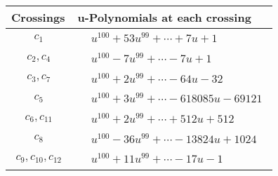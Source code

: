 \documentclass[1p]{elsarticle_modified}
\theoremstyle{definition}
\begin{document}
\begin{tabular}{m{50pt}|m{274pt}}
Crossings & \hspace{64pt}u-Polynomials at each crossing \\
\hline $$\begin{aligned}c_{1}\end{aligned}$$&$\begin{aligned}
&u^{100}+53 u^{99}+\cdots+7 u+1
\end{aligned}$\\
\hline $$\begin{aligned}c_{2},c_{4}\end{aligned}$$&$\begin{aligned}
&u^{100}-7 u^{99}+\cdots-7 u+1
\end{aligned}$\\
\hline $$\begin{aligned}c_{3},c_{7}\end{aligned}$$&$\begin{aligned}
&u^{100}+2 u^{99}+\cdots-64 u-32
\end{aligned}$\\
\hline $$\begin{aligned}c_{5}\end{aligned}$$&$\begin{aligned}
&u^{100}+3 u^{99}+\cdots-618085 u-69121
\end{aligned}$\\
\hline $$\begin{aligned}c_{6},c_{11}\end{aligned}$$&$\begin{aligned}
&u^{100}+2 u^{99}+\cdots+512 u+512
\end{aligned}$\\
\hline $$\begin{aligned}c_{8}\end{aligned}$$&$\begin{aligned}
&u^{100}-36 u^{99}+\cdots-13824 u+1024
\end{aligned}$\\
\hline $$\begin{aligned}c_{9},c_{10},c_{12}\end{aligned}$$&$\begin{aligned}
&u^{100}+11 u^{99}+\cdots-17 u-1
\end{aligned}$\\
\hline
\end{tabular}\\~\\
\newpage\renewcommand{\arraystretch}{1}
\end{document}
